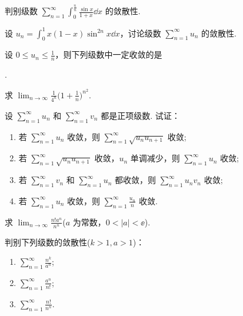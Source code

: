 	\begin{ti}
		判别级数 $\sum_{n=1}^{\infty} \int_{0}^{\frac{\uppi}{n}} \frac{\sin x}{1 + x} \dd{x}$ 的敛散性.
	\end{ti}

	\begin{ti}
		设 $u_{n} = \int_{0}^{1} x (1 - x) \sin^{2n}x \dd{x}$，讨论级数 $\sum_{n=1}^{\infty} u_{n}$ 的敛散性.
	\end{ti}

	\begin{ti}
		设 $0 \leq u_{n} \leq \frac{1}{n}$，则下列级数中一定收敛的是
		
		\noindent\kuo.

	\end{ti}

	\begin{ti}
		求 $\lim_{n \to \infty} \frac{1}{4^{n}} \bigl( 1 + \frac{1}{n} \bigr)^{n^{2}}$.
	\end{ti}

	\begin{ti}
		设 $\sum_{n=1}^{\infty} u_{n}$ 和 $\sum_{n=1}^{\infty} v_{n}$ 都是正项级数. 试证：
		\begin{enumerate}
			\item 若 $\sum_{n=1}^{\infty} u_{n}$ 收敛，则 $\sum_{n=1}^{\infty} \sqrt{u_{n} u_{n+1}}$ 收敛;
			\item 若 $\sum_{n=1}^{\infty} \sqrt{u_{n} u_{n+1}}$ 收敛，$u_{n}$ 单调减少，则 $\sum_{n=1}^{\infty} u_{n}$ 收敛;
			\item 若 $\sum_{n=1}^{\infty} v_{n}$ 和 $\sum_{n=1}^{\infty} u_{n}$ 都收敛，则 $\sum_{n=1}^{\infty} u_{n} v_{n}$ 收敛;
			\item 若 $\sum_{n=1}^{\infty} u_{n}$ 收敛，则 $\sum_{n=1}^{\infty} \frac{u_{n}}{n}$ 收敛. 
		\end{enumerate}
	\end{ti}

	\begin{ti}
		求 $\lim_{n \to \infty} \frac{n! a^{n}}{n^{n}}$($a$ 为常数，$0 < |a| < \ee$).
	\end{ti}

	\begin{ti}
		判别下列级数的敛散性($k > 1, a > 1$)：
		\begin{enumerate}
			\item $\sum_{n=1}^{\infty} \frac{n^{k}}{a^{n}}$;
			\item $\sum_{n=1}^{\infty} \frac{a^{n}}{n!}$;
			\item $\sum_{n=1}^{\infty} \frac{n!}{n^{n}}$.
		\end{enumerate}
	\end{ti}

